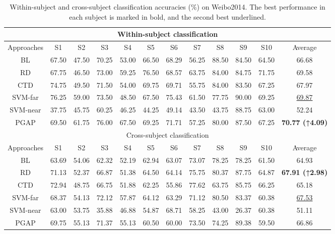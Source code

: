 \documentclass[journal,twocolumn]{IEEEtran}
\begin{document}
\begin{table}[htpb]
  \centering
  \caption{Within-subject and cross-subject classification accuracies (\%) on Weibo2014. The best performance in each subject is marked in bold, and the second best underlined.}
  \label{tab:weibo2014-result}
  \begin{tabular}{c|c|c|c|c|c|c|c|c|c|c|c}
  \toprule
  \multicolumn{12}{c}{Within-subject classification} \\
  \midrule
  Approaches & S1 & S2 & S3 & S4 & S5 & S6 & S7 & S8 & S9 & S10 & Average \\
  \midrule
  BL & 67.50 & 47.50 & 70.25 & 53.00 & 66.50 & 68.29 & 56.25 & 88.50 & 84.50 & 64.50 & 66.68 \\
  RD & 67.75 & 46.50 & 73.00 & 59.25 & 76.50 & 68.57 & 63.75 & 84.00 & 84.75 & 71.75 & 69.58 \\
  CTD & 74.75 & 49.50 & 71.50 & 54.00 & 69.75 & 69.71 & 55.75 & 84.00 & 83.50 & 67.25 & 67.97 \\
  SVM-far & 76.25 & 59.00 & 73.50 & 48.50 & 67.50 & 75.43 & 61.50 & 77.75 & 90.00 & 69.25 & \underline{69.87} \\
  SVM-near & 37.75 & 45.75 & 60.25 & 46.25 & 44.25 & 49.14 & 43.50 & 43.75 & 88.75 & 63.00 & 52.24 \\
  PGAP & 69.50 & 61.75 & 76.00 & 67.50 & 69.25 & 71.71 & 57.25 & 80.00 & 87.50 & 67.25 & \textbf{70.77 (↑4.09)} \\
  \midrule
  \multicolumn{12}{c}{Cross-subject classification} \\
  \midrule
  Approaches & S1 & S2 & S3 & S4 & S5 & S6 & S7 & S8 & S9 & S10 & Average \\
  \midrule
  BL & 63.69 & 54.06 & 62.32 & 52.19 & 62.94 & 63.07 & 73.07 & 78.25 & 78.25 & 61.50 & 64.93 \\
  RD & 71.13 & 52.37 & 66.87 & 51.38 & 64.50 & 64.14 & 75.75 & 80.37 & 87.75 & 64.87 & \textbf{67.91 (↑2.98)} \\
  CTD & 72.94 & 48.75 & 66.75 & 51.88 & 62.25 & 55.86 & 77.62 & 63.75 & 85.75 & 66.25 & 65.18 \\
  SVM-far & 68.37 & 54.13 & 72.12 & 57.87 & 64.12 & 63.29 & 71.12 & 80.50 & 83.37 & 60.38 & \underline{67.53} \\
  SVM-near & 63.00 & 53.75 & 35.88 & 46.88 & 54.87 & 68.71 & 58.25 & 43.00 & 26.37 & 60.38 & 51.11 \\
  PGAP & 69.75 & 55.13 & 71.37 & 55.13 & 60.50 & 60.00 & 73.50 & 74.25 & 89.38 & 59.50 & 66.86 \\
  \bottomrule
  \end{tabular}
\end{table}
  
\end{document}
